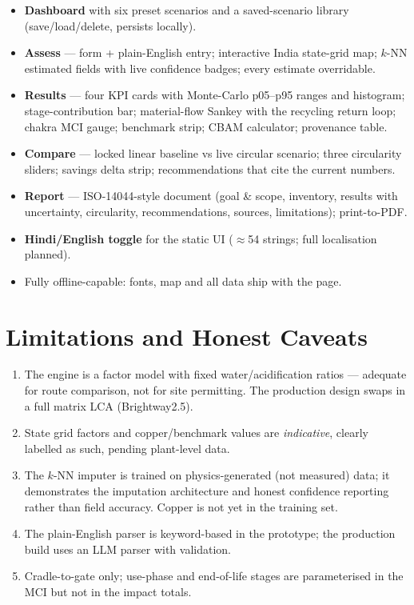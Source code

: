 \documentclass[11pt,a4paper]{article}
\begin{document}
\begin{itemize}[leftmargin=1.4em, itemsep=1pt]
  \item \textbf{Dashboard} with six preset scenarios and a saved-scenario library
        (save/load/delete, persists locally).
  \item \textbf{Assess} --- form + plain-English entry; interactive India state-grid map;
        $k$-NN estimated fields with live confidence badges; every estimate overridable.
  \item \textbf{Results} --- four KPI cards with Monte-Carlo p05--p95 ranges and histogram;
        stage-contribution bar; material-flow Sankey with the recycling return loop; chakra
        MCI gauge; benchmark strip; CBAM calculator; provenance table.
  \item \textbf{Compare} --- locked linear baseline vs live circular scenario; three
        circularity sliders; savings delta strip; recommendations that cite the current
        numbers.
  \item \textbf{Report} --- ISO-14044-style document (goal \& scope, inventory, results with
        uncertainty, circularity, recommendations, sources, limitations); print-to-PDF.
  \item \textbf{Hindi/English toggle} for the static UI ($\approx$54 strings; full
        localisation planned).
  \item Fully offline-capable: fonts, map and all data ship with the page.
\end{itemize}

\section{Limitations and Honest Caveats}

\begin{enumerate}[leftmargin=1.6em, itemsep=1pt]
  \item The engine is a factor model with fixed water/acidification ratios --- adequate for
        route comparison, not for site permitting. The production design swaps in a full
        matrix LCA (Brightway2.5).
  \item State grid factors and copper/benchmark values are \emph{indicative}, clearly
        labelled as such, pending plant-level data.
  \item The $k$-NN imputer is trained on physics-generated (not measured) data; it
        demonstrates the imputation architecture and honest confidence reporting rather
        than field accuracy. Copper is not yet in the training set.
  \item The plain-English parser is keyword-based in the prototype; the production build
        uses an LLM parser with validation.
  \item Cradle-to-gate only; use-phase and end-of-life stages are parameterised in the MCI
        but not in the impact totals.
\end{enumerate}
\end{document}
